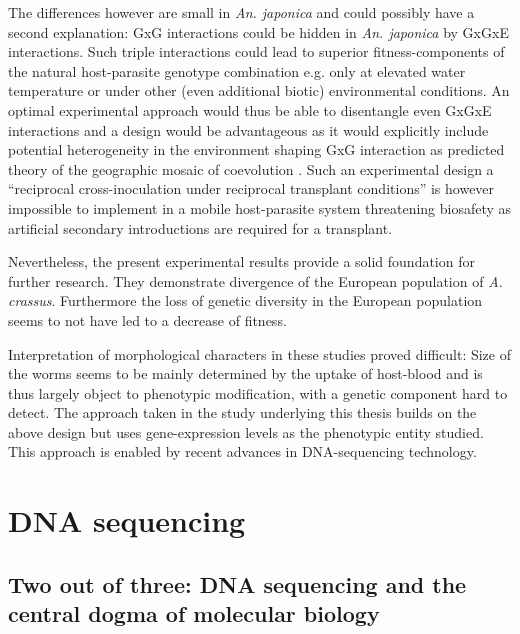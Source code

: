 The differences however are small in \textit{An. japonica} and could
possibly have a second explanation: GxG interactions could be hidden
in \textit{An. japonica} by GxGxE interactions. Such triple
interactions could lead to superior fitness-components of the natural
host-parasite genotype combination e.g. only at elevated water
temperature or under other (even additional biotic) environmental
conditions. An optimal experimental approach would thus be able to
disentangle even GxGxE interactions and a design would be
advantageous as it would explicitly include potential heterogeneity in
the environment shaping GxG interaction as predicted theory of the
geographic mosaic of coevolution \cite{thompson2005geographic}. Such
an experimental design a ``reciprocal cross-inoculation under
reciprocal transplant conditions'' \cite{pmid18419564} is however
impossible to implement in a mobile host-parasite system threatening
biosafety as artificial secondary introductions are required for a
transplant.

Nevertheless, the present experimental results provide a solid
foundation for further research. They demonstrate divergence of the
European population of \textit{A. crassus}. Furthermore the loss of
genetic diversity in the European population
\cite{wielgoss_population_2008} seems to not have led to a decrease of
fitness.

Interpretation of morphological characters in these studies proved
difficult: Size of the worms seems to be mainly determined by the
uptake of host-blood and is thus largely object to phenotypic
modification, with a genetic component hard to detect. The approach
taken in the study underlying this thesis builds on the above design
but uses gene-expression levels as the phenotypic entity studied. This
approach is enabled by recent advances in DNA-sequencing technology.

\section{DNA sequencing}

\subsection{Two out of three: DNA sequencing and the central dogma of
  molecular biology}
\label{sec:dm}



